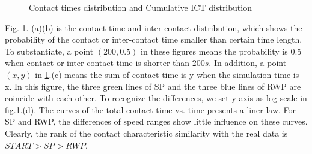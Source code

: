 \begin{figure}
\centering
{}
\caption{Contact times distribution and Cumulative ICT distribution}\label{figure_contacts}
\end{figure}

Fig. \ref{figure_contacts}. (a)(b) is the contact time and inter-contact distribution, which shows the probability of the contact or inter-contact time smaller than certain time length. To substantiate, a point $(200,0.5)$ in these figures means the probability is 0.5 when contact or inter-contact time is shorter than $200s$. In addition, a point $(x,y)$ in \ref{figure_contacts}.(c) means the sum of contact time is y when the simulation time is x. In this figure, the three green lines of SP and the three blue lines of RWP are coincide with each other. To recognize the differences, we set y axis as log-scale in fig.\ref{figure_contacts}.(d).
The curves of the total contact time vs. time presents a liner law. For SP and RWP, the differences of speed ranges show little influence on these curves.
Clearly, the rank of the contact characteristic similarity with the real data is $START>SP>RWP$. 

